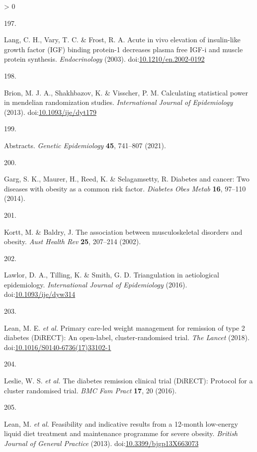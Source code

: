 \documentclass[11pt,twoside]{bristolthesis}
\newlength{\cslhangindent}
\newlength{\csllabelwidth}
\newenvironment{CSLReferences}[2] %
 {%
  \setlength{\parindent}{0pt}
  \ifodd #1 \everypar{\setlength{\hangindent}{\cslhangindent}}\ignorespaces\fi
  \ifnum #2 > 0
  \setlength{\parskip}{#2\baselineskip}
  \fi
 }%
 {}
\newcommand{\CSLLeftMargin}[1]{\parbox[t]{\csllabelwidth}{#1}}
\newcommand{\CSLRightInline}[1]{\parbox[t]{\linewidth - \csllabelwidth}{#1}\break}
\begin{document}
\begin{CSLReferences}{0}{0}
\leavevmode\hypertarget{ref-Lang2003}{}%
\CSLLeftMargin{197. }
\CSLRightInline{Lang, C. H., Vary, T. C. \& Frost, R. A. Acute in vivo elevation of insulin-like growth factor (IGF) binding protein-1 decreases plasma free IGF-i and muscle protein synthesis. \emph{Endocrinology} (2003). doi:\href{https://doi.org/10.1210/en.2002-0192}{10.1210/en.2002-0192}}

\leavevmode\hypertarget{ref-Brion2013}{}%
\CSLLeftMargin{198. }
\CSLRightInline{Brion, M. J. A., Shakhbazov, K. \& Visscher, P. M. Calculating statistical power in mendelian randomization studies. \emph{International Journal of Epidemiology} (2013). doi:\href{https://doi.org/10.1093/ije/dyt179}{10.1093/ije/dyt179}}

\leavevmode\hypertarget{ref-IGES2021}{}%
\CSLLeftMargin{199. }
\CSLRightInline{Abstracts. \emph{Genetic Epidemiology} \textbf{45}, 741--807 (2021).}

\leavevmode\hypertarget{ref-Garg2014}{}%
\CSLLeftMargin{200. }
\CSLRightInline{Garg, S. K., Maurer, H., Reed, K. \& Selagamsetty, R. Diabetes and cancer: Two diseases with obesity as a common risk factor. \emph{Diabetes Obes Metab} \textbf{16}, 97--110 (2014).}

\leavevmode\hypertarget{ref-Kortt2002}{}%
\CSLLeftMargin{201. }
\CSLRightInline{Kortt, M. \& Baldry, J. The association between musculoskeletal disorders and obesity. \emph{Aust Health Rev} \textbf{25}, 207--214 (2002).}

\leavevmode\hypertarget{ref-Lawlor2016}{}%
\CSLLeftMargin{202. }
\CSLRightInline{Lawlor, D. A., Tilling, K. \& Smith, G. D. Triangulation in aetiological epidemiology. \emph{International Journal of Epidemiology} (2016). doi:\href{https://doi.org/10.1093/ije/dyw314}{10.1093/ije/dyw314}}

\leavevmode\hypertarget{ref-Lean2018}{}%
\CSLLeftMargin{203. }
\CSLRightInline{Lean, M. E. \emph{et al.} Primary care-led weight management for remission of type 2 diabetes (DiRECT): An open-label, cluster-randomised trial. \emph{The Lancet} (2018). doi:\href{https://doi.org/10.1016/S0140-6736(17)33102-1}{10.1016/S0140-6736(17)33102-1}}

\leavevmode\hypertarget{ref-Leslie2016}{}%
\CSLLeftMargin{204. }
\CSLRightInline{Leslie, W. S. \emph{et al.} The diabetes remission clinical trial (DiRECT): Protocol for a cluster randomised trial. \emph{BMC Fam Pract} \textbf{17}, 20 (2016).}

\leavevmode\hypertarget{ref-Lean2013}{}%
\CSLLeftMargin{205. }
\CSLRightInline{Lean, M. \emph{et al.} Feasibility and indicative results from a 12-month low-energy liquid diet treatment and maintenance programme for severe obesity. \emph{British Journal of General Practice} (2013). doi:\href{https://doi.org/10.3399/bjgp13X663073}{10.3399/bjgp13X663073}}


\end{CSLReferences}
\end{document}
